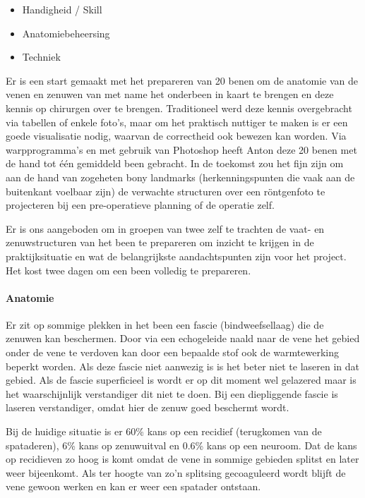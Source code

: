 \begin{itemize}
	\item Handigheid / Skill 
	\item Anatomiebeheersing 
	\item Techniek 
\end{itemize}

Er is een start gemaakt met het prepareren van 20 benen om de anatomie van de venen en zenuwen van met name het onderbeen in kaart te brengen en deze kennis op chirurgen over te brengen. Traditioneel werd deze kennis overgebracht via tabellen of enkele foto's, maar om het praktisch nuttiger te maken is er een goede visualisatie nodig, waarvan de correctheid ook bewezen kan worden. Via warpprogramma's en met gebruik van Photoshop heeft Anton deze 20 benen met de hand tot \'e\'en gemiddeld been gebracht. In de toekomst zou het fijn zijn om aan de hand van zogeheten bony landmarks (herkenningspunten die vaak aan de buitenkant voelbaar zijn) de verwachte structuren over een r\"ontgenfoto te projecteren bij een pre-operatieve planning of de operatie zelf. 

Er is ons aangeboden om in groepen van twee zelf te trachten de vaat- en zenuwstructuren van het been te prepareren om inzicht te krijgen in de praktijksituatie en wat de belangrijkste aandachtspunten zijn voor het project. Het kost twee dagen om een been volledig te prepareren. 

\paragraph{Anatomie}
Er zit op sommige plekken in het been een fascie (bindweefsellaag) die de zenuwen kan beschermen. Door via een echogeleide naald naar de vene het gebied onder de vene te verdoven kan door een bepaalde stof ook de warmtewerking beperkt worden. Als deze fascie niet aanwezig is is het beter niet te laseren in dat gebied. Als de fascie superficieel is wordt er op dit moment wel gelazered maar is het waarschijnlijk verstandiger dit niet te doen. Bij een diepliggende fascie is laseren verstandiger, omdat hier de zenuw goed beschermt wordt. 

Bij de huidige situatie is er 60\% kans op een recidief (terugkomen van de spataderen), 6\% kans op zenuwuitval en 0.6\% kans op een neuroom. Dat de kans op recidieven zo hoog is komt omdat de vene in sommige gebieden splitst en later weer bijeenkomt. Als ter hoogte van zo'n splitsing gecoaguleerd wordt blijft de vene gewoon werken en kan er weer een spatader ontstaan. 


